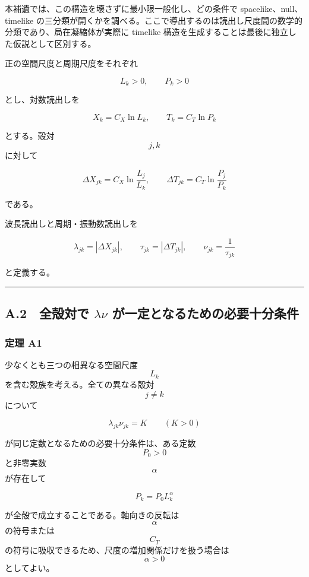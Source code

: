 \documentclass[
  a4paper,
]{ltjsarticle}
\begin{document}
本補遺では、この構造を壊さずに最小限一般化し、どの条件で
spacelike、null、timelike
の三分類が開くかを調べる。ここで導出するのは読出し尺度間の数学的分類であり、局在凝縮体が実際に
timelike 構造を生成することは最後に独立した仮説として区別する。

正の空間尺度と周期尺度をそれぞれ

\[
L_k>0,
\qquad
P_k>0
\]

とし、対数読出しを

\[
X_k=C_X\ln L_k,
\qquad
T_k=C_T\ln P_k
\tag{A1}
\]

とする。殻対 \[j,k\] に対して

\[
\Delta X_{jk}
=
C_X\ln\frac{L_j}{L_k},
\qquad
\Delta T_{jk}
=
C_T\ln\frac{P_j}{P_k}
\tag{A2}
\]

である。

波長読出しと周期・振動数読出しを

\[
\lambda_{jk}=|\Delta X_{jk}|,
\qquad
\tau_{jk}=|\Delta T_{jk}|,
\qquad
\nu_{jk}=\frac{1}{\tau_{jk}}
\tag{A3}
\]

と定義する。

\begin{center}\rule{0.5\linewidth}{0.5pt}\end{center}

\subsection{\texorpdfstring{A.2　全殻対で \(\lambda\nu\)
が一定となるための必要十分条件}{A.2　全殻対で \textbackslash lambda\textbackslash nu が一定となるための必要十分条件}}\label{a.2-ux5168ux6bbbux5bfeux3067-lambdanu-ux304cux4e00ux5b9aux3068ux306aux308bux305fux3081ux306eux5fc5ux8981ux5341ux5206ux6761ux4ef6}

\subsubsection{定理 A1}\label{ux5b9aux7406-a1}

少なくとも三つの相異なる空間尺度 \[L_k\]
を含む殻族を考える。全ての異なる殻対 \[j\neq k\] について

\[
\lambda_{jk}\nu_{jk}=K
\qquad
(K>0)
\tag{A4}
\]

が同じ定数となるための必要十分条件は、ある定数 \[P_0>0\] と非零実数
\[\alpha\] が存在して

\[
\boxed{
P_k=P_0L_k^{\alpha}
}
\tag{A5}
\]

が全殻で成立することである。軸向きの反転は \[\alpha\] の符号または
\[C_T\] の符号に吸収できるため、尺度の増加関係だけを扱う場合は
\[\alpha>0\] としてよい。
\end{document}
